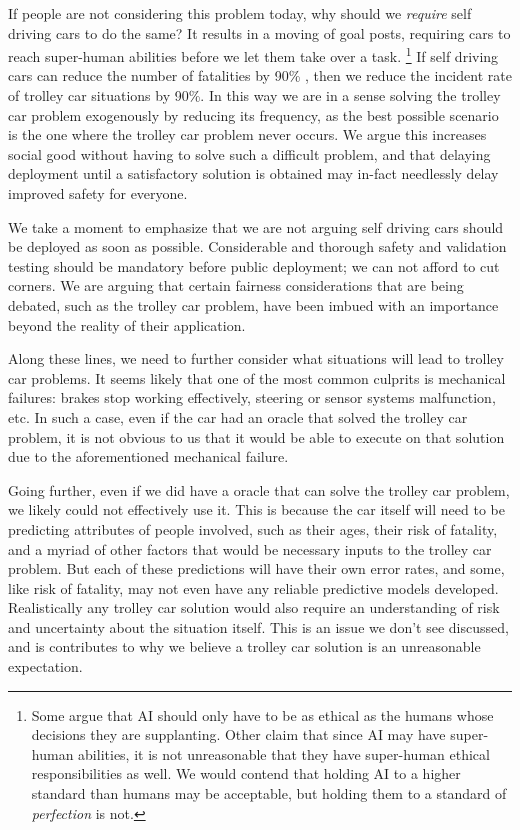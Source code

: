 \documentclass[11pt]{article}
\begin{document}
If people are not considering this problem today, why should we \textit{require} self driving cars to do the same? It results in a moving of goal posts, requiring cars to reach super-human abilities before we let them take over a task.%
\footnote{Some argue that AI should only have to be as ethical as the humans whose decisions they are supplanting. Other claim that since AI may have super-human abilities, it is not unreasonable that they have super-human ethical responsibilities as well. We would contend that holding AI to a higher standard than humans may be acceptable, but holding them to a standard of \textit{perfection} is not.}
If self driving cars can reduce the number of fatalities by 90\% \cite{Bertoncello2015}, then we reduce the incident rate of trolley car situations by 90\%. In this way we are in a sense solving the trolley car problem exogenously by reducing its frequency, as the best possible scenario is the one where the trolley car problem never occurs.  We argue this increases social good without having to solve such a difficult problem, and that delaying deployment until a satisfactory solution is obtained may in-fact needlessly delay improved safety for everyone. 

We take a moment to emphasize that we are not arguing self driving cars should be deployed as soon as possible. Considerable and thorough safety and validation testing should be mandatory before public deployment; we can not afford to cut corners. We are arguing that certain fairness considerations that are being debated, such as the trolley car problem, have been imbued with an importance beyond the reality of their application. 

Along these lines, we need to further consider what situations will lead to trolley car problems. It seems likely that one of the most common culprits is mechanical failures: brakes stop working effectively, steering or sensor systems malfunction, etc. In such a case, even if the car had an oracle that solved the trolley car problem, it is not obvious to us that it would be able to execute on that solution due to the aforementioned mechanical failure. 

Going further, even if we did have a oracle that can solve the trolley car problem, we likely could not effectively use it. This is because the car itself will need to be predicting attributes of people involved, such as their ages, their risk of fatality, and a myriad of other factors that would be necessary inputs to the trolley car problem. But each of these predictions will have their own error rates, and some, like risk of fatality, may not even have any reliable predictive models developed. Realistically any trolley car solution would also require an understanding of risk and uncertainty about the situation itself. This is an issue we don't see discussed, and is contributes to why we believe a trolley car solution is an unreasonable expectation.
\end{document}
